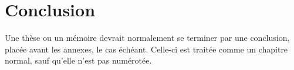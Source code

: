\chapter*{Conclusion}         %

Une thèse ou un mémoire devrait normalement se terminer par une
conclusion, placée avant les annexes, le cas échéant. Celle-ci est
traitée comme un chapitre normal, sauf qu'elle n'est pas numérotée.


